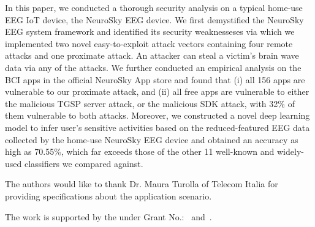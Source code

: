 In this paper, we conducted a thorough security analysis on a typical home-use EEG IoT device, the NeuroSky EEG device. We first demystified the NeuroSky EEG system framework and identified its security weaknesseses via which we implemented two novel easy-to-exploit attack vectors containing four remote attacks and one proximate attack. An attacker can steal a victim's brain wave data via any of the attacks. We further conducted an empirical analysis on the BCI apps in the official NeuroSky App store and found that (i) all 156 apps are vulnerable to our proximate attack, and (ii) all free apps are vulnerable to either the malicious TGSP server attack, or the malicious SDK attack, with 32\% of them vulnerable to both attacks. Moreover, we constructed a novel deep learning model to infer user's sensitive activities based on the reduced-featured EEG data collected by the home-use NeuroSky EEG device and obtained an accuracy as high as 70.55\%, which far exceeds those of the other 11 well-known and widely-used classifiers we compared against. 


\begin{acks}

The authors would like to thank Dr. Maura Turolla of Telecom
Italia for providing specifications about the application scenario.

The work is supported by the  under Grant
No.:~
and~.


\end{acks}



